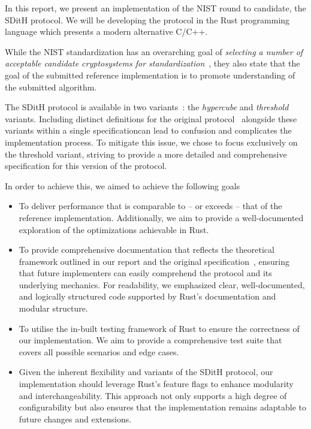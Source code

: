 \documentclass[11pt]{report}
\theoremstyle{definition}
\theoremstyle{plain}
\begin{document}
In this report, we present an implementation of the NIST round to candidate, the SDitH protocol. We will be developing the protocol in the Rust programming language which presents a modern alternative C/C++.

While the NIST standardization has an overarching goal of \textit{selecting a number of acceptable candidate cryptosystems for standardization}~\cite{nistcall}, they also state that the goal of the submitted reference implementation is to promote understanding of the submitted algorithm.

The SDitH protocol is available in two variants~\cite{aguilarsyndrome11}: the \textit{hypercube} and \textit{threshold} variants. Including distinct definitions for the original protocol~\cite{feneuil2022syndrome} alongside these variants within a single specificationcan lead to confusion and complicates the implementation process. To mitigate this issue, we chose to focus exclusively on the threshold variant, striving to provide a more detailed and comprehensive specification for this version of the protocol.

In order to achieve this, we aimed to achieve the following goals

\begin{itemize}
  \item To deliver performance that is comparable to -- or exceeds -- that of the reference implementation. Additionally, we aim to provide a well-documented exploration of the optimizations achievable in Rust.
  \item To provide comprehensive documentation that reflects the theoretical framework outlined in our report and the original specification~\cite{aguilarsyndrome11}, ensuring that future implementers can easily comprehend the protocol and its underlying mechanics. For readability, we emphasized clear, well-documented, and logically structured code supported by Rust's documentation and modular structure.
  \item To utilise the in-built testing framework of Rust to ensure the correctness of our implementation. We aim to provide a comprehensive test suite that covers all possible scenarios and edge cases.
  \item Given the inherent flexibility and variants of the SDitH protocol, our implementation should leverage Rust's feature flags to enhance modularity and interchangeability. This approach not only supports a high degree of configurability but also ensures that the implementation remains adaptable to future changes and extensions.
\end{itemize}
\end{document}
